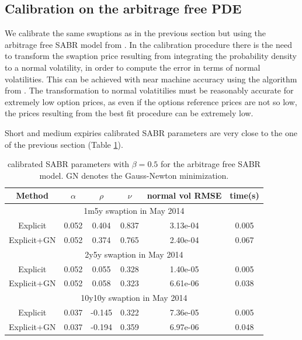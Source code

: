 \documentclass[]{rAMF2e}
\begin{document}
\subsection{Calibration on the arbitrage free PDE}
We calibrate the same swaptions as in the previous section but using the arbitrage free SABR model from \citep{hagan2013arbitrage}. In the calibration procedure there is the need to transform the swaption price resulting from integrating the probability density to a normal volatility, in order to compute the error in terms of normal volatilities. This can be achieved with near machine accuracy using the algorithm from \citep{lefloch2014bpvol}. The transformation to normal volatitilies must be reasonably accurate for extremely low option prices, as even if the options reference prices are not so low, the prices resulting from the best fit procedure can be extremely low.

Short and medium expiries calibrated SABR parameters are very close to the one of the previous section (Table \ref{tbl:arbfree_sabr_fit}).
\begin{table}[hbp]
\begin{center}
\caption{\label{tbl:arbfree_sabr_fit}calibrated SABR parameters with $\beta=0.5$ for the arbitrage free SABR model. GN denotes the Gauss-Newton minimization.}
\begin{tabular}{c c c c c c}
\hline
Method & $\alpha$ & $\rho$ &$\nu$ & normal vol RMSE & time(s) \\
\hline
\multicolumn{6}{c}{1m5y swaption in May 2014}\\
\hline
Explicit & 0.052 & 0.404 & 0.837 & 3.13e-04 & 0.005 \\
Explicit+GN & 0.052 & 0.374 & 0.765 & 2.40e-04 & 0.067\\
\hline
\multicolumn{6}{c}{2y5y swaption in May 2014}\\
\hline
Explicit & 0.052 & 0.055 & 0.328 & 1.40e-05 & 0.005\\
Explicit+GN & 0.052 & 0.058 & 0.323 & 6.61e-06 & 0.038\\
\hline
\multicolumn{6}{c}{10y10y swaption in May 2014}\\
\hline
Explicit & 0.037 & -0.145 & 0.322 & 7.36e-05 & 0.005\\
Explicit+GN & 0.037 & -0.194 & 0.359 & 6.97e-06 & 0.048\\
\hline
\end{tabular}
\end{center}
\end{table}
\end{document}
